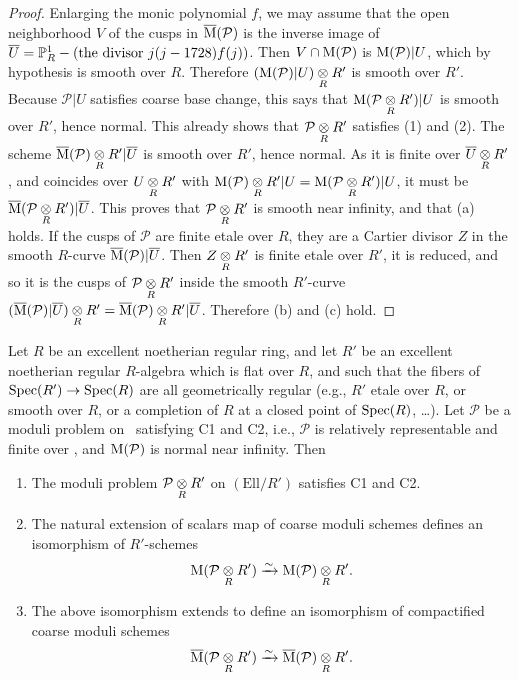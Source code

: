 \begin{proof}
Enlarging the monic polynomial $f$, we may assume that the open neighborhood $V$ of the cusps in $\overline{\mathrm{M}}(\mathcal{P})$ is the inverse image of $\overline{U} = \mathbb{P}^1_R - (\text{the divisor } j(j-1728)f(j))$. Then $V \cap \mathrm{M}(\mathcal{P})$ is $\mathrm{M}(\mathcal{P})|U$, which by hypothesis is smooth over $R$. Therefore $(\mathrm{M}(\mathcal{P})|U) \underset{R}{\otimes} R'$ is smooth over $R'$. Because $\mathcal{P}|U$ satisfies coarse base change, this says that $\mathrm{M}(\mathcal{P} \underset{R}{\otimes} R')|U$ is smooth over $R'$, hence normal. This already shows that $\mathcal{P} \underset{R}{\otimes} R'$ satisfies (1) and (2). The scheme $\overline{\mathrm{M}}(\mathcal{P}) \underset{R}{\otimes} R' | \overline{U}$ is smooth over $R'$, hence normal. As it is finite over $\overline{U} \underset{R}{\otimes} R'$, and coincides over $U \underset{R}{\otimes} R'$ with $\mathrm{M}(\mathcal{P}) \underset{R}{\otimes} R' | U = \mathrm{M}(\mathcal{P} \underset{R}{\otimes} R') | U$, it must be $\overline{\mathrm{M}}(\mathcal{P} \underset{R}{\otimes} R') | \overline{U}$. This proves that $\mathcal{P} \underset{R}{\otimes} R'$ is smooth near infinity, and that (a) holds. If the cusps of $\mathcal{P}$ are finite etale over $R$, they are a Cartier divisor $Z$ in the smooth $R$-curve $\overline{\mathrm{M}}(\mathcal{P})|\overline{U}$. Then $Z \underset{R}{\otimes} R'$ is finite etale over $R'$, it is reduced, and so it is the cusps of $\mathcal{P} \underset{R}{\otimes} R'$ inside the smooth $R'$-curve $(\overline{\mathrm{M}}(\mathcal{P})|\overline{U}) \underset{R}{\otimes} R' = \overline{\mathrm{M}}(\mathcal{P}) \underset{R}{\otimes} R' | \overline{U}$. Therefore (b) and (c) hold.
\end{proof}

\begin{kprop}\label{prop:8.6.7}
Let $R$ be an excellent noetherian regular ring, and let $R'$ be an excellent noetherian regular $R$-algebra which is flat over $R$, and such that the fibers of $\operatorname{Spec}(R') \to \operatorname{Spec}(R)$ are all geometrically regular (e.g., $R'$ etale over $R$, or smooth over $R$, or a completion of $R$ at a closed point of $\operatorname{Spec}(R)$, \dots). Let $\mathcal{P}$ be a moduli problem on \EllR\ satisfying C1 and C2, i.e., $\mathcal{P}$ is relatively representable and finite over \EllR, and $\mathrm{M}(\mathcal{P})$ is normal near infinity. Then
\begin{enumerate}[(1)]
\item The moduli problem $\mathcal{P} \underset{R}{\otimes} R'$ on $(\mathrm{Ell}/R')$ satisfies C1 and C2.
\item The natural extension of scalars map of coarse moduli schemes defines an isomorphism of $R'$-schemes
\[
\mathrm{M}(\mathcal{P} \underset{R}{\otimes} R') \xrightarrow{\sim} \mathrm{M}(\mathcal{P}) \underset{R}{\otimes} R' .
\]
\item The above isomorphism extends to define an isomorphism of compactified coarse moduli schemes
\[
\overline{\mathrm{M}}(\mathcal{P} \underset{R}{\otimes} R') \xrightarrow{\sim} \overline{\mathrm{M}}(\mathcal{P}) \underset{R}{\otimes} R' .
\]
\end{enumerate}
\end{kprop}

